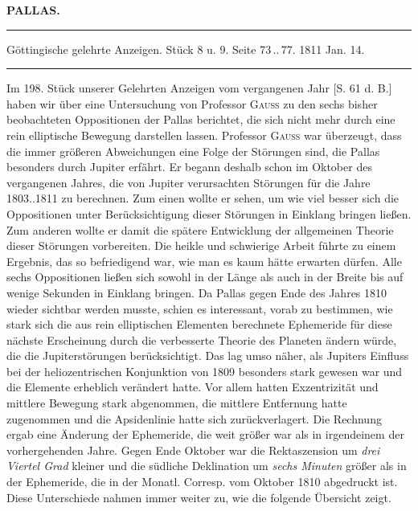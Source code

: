 \clearpage{}\hypertarget{native-327-lower}{}\label{native-327-lower}

\begin{center}\textbf{PALLAS.}\par\vspace{4pt}\hrule\vspace{4pt}\fontsize{10}{12}\selectfont Göttingische gelehrte Anzeigen. Stück 8 u. 9. Seite 73\,..\,77. 1811 Jan. 14.\par\vspace{4pt}\hrule\vspace{4pt}\end{center}

\par\indent Im 198. Stück unserer Gelehrten Anzeigen vom vergangenen Jahr [S. 61 d. B.] haben wir über eine Untersuchung von Professor \textsc{Gauss} zu den sechs bisher beobachteten Oppositionen der Pallas berichtet, die sich nicht mehr durch eine rein elliptische Bewegung darstellen lassen. Professor \textsc{Gauss} war überzeugt, dass die immer größeren Abweichungen eine Folge der Störungen sind, die Pallas besonders durch Jupiter erfährt. Er begann deshalb schon im Oktober des vergangenen Jahres, die von Jupiter verursachten Störungen für die Jahre 1803..1811 zu berechnen. Zum einen wollte er sehen, um wie viel besser sich die Oppositionen unter Berücksichtigung dieser Störungen in Einklang bringen ließen. Zum anderen wollte er damit die spätere Entwicklung der allgemeinen Theorie dieser Störungen vorbereiten. Die heikle und schwierige Arbeit führte zu einem Ergebnis, das so befriedigend war, wie man es kaum hätte erwarten dürfen. Alle sechs Oppositionen ließen sich sowohl in der Länge als auch in der Breite bis auf wenige Sekunden in Einklang bringen. Da Pallas gegen Ende des Jahres 1810 wieder sichtbar werden musste, schien es interessant, vorab zu bestimmen, wie stark sich die aus rein elliptischen Elementen berechnete Ephemeride für diese nächste Erscheinung durch die verbesserte Theorie des Planeten ändern würde, die die Jupiterstörungen berücksichtigt. Das lag umso näher, als Jupiters Einfluss bei der heliozentrischen Konjunktion von 1809 besonders stark gewesen war und die Elemente erheblich verändert hatte. Vor allem hatten Exzentrizität und mittlere Bewegung stark abgenommen, die mittlere Entfernung hatte zugenommen und die Apsidenlinie hatte sich zurückverlagert. Die Rechnung ergab eine Änderung der Ephemeride, die weit größer war als in irgendeinem der vorhergehenden Jahre. Gegen Ende Oktober war die Rektaszension um \emph{drei Viertel Grad} kleiner und die südliche Deklination um \emph{sechs Minuten} größer als in der Ephemeride, die in der Monatl. Corresp. vom Oktober 1810 abgedruckt ist. Diese Unterschiede nahmen immer weiter zu, wie die folgende Übersicht zeigt.
